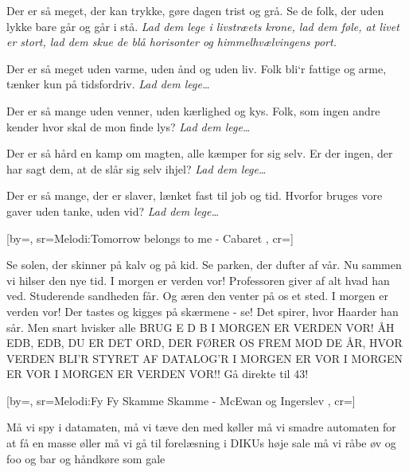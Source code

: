 \documentclass[pdftex,12pt]{article}
\begin{document}
\begin{songs}{}
\beginverse
Der er så meget, der kan trykke,
gøre dagen trist og grå.
Se de folk, der uden lykke
bare går og går i stå.
\emph{Lad dem lege i livstræets krone,
lad dem føle, at livet er stort,
lad dem skue de blå horisonter
og himmelhvælvingens port.}

\endverse
\beginverse
Der er så meget uden varme,
uden ånd og uden liv.
Folk bli`r fattige og arme,
tænker kun på tidsfordriv.
\emph{Lad dem lege\ldots}

\endverse
\beginverse
Der er så mange uden venner,
uden kærlighed og kys.
Folk, som ingen andre kender
hvor skal de mon finde lys?
\emph{Lad dem lege\ldots}

\endverse
\beginverse
Der er så hård en kamp om magten,
alle kæmper for sig selv.
Er der ingen, der har sagt dem,
at de slår sig selv ihjel?
\emph{Lad dem lege\ldots}

\endverse
\beginverse
Der er så mange, der er slaver,
lænket fast til job og tid.
Hvorfor bruges vore gaver
uden tanke, uden vid?
\emph{Lad dem lege\ldots}

\endverse
\endsong



[by={},
sr={Melodi:Tomorrow belongs to me - Cabaret}
,
cr={}]\hypertarget{I Morgen er Verden Vor}{}
\label{song42}

\beginverse
Se solen, der skinner
på kalv og på kid.
Se parken, der dufter af vår.
Nu sammen vi hilser
den nye tid.
I morgen er verden vor!
\endverse
\beginverse
Professoren giver
af alt hvad han ved.
Studerende sandheden får.
Og æren den venter
på os et sted.
I morgen er verden vor!
\endverse
\beginverse
Der tastes og kigges
på skærmene - se!
Det spirer, hvor Haarder han sår.
Men snart hvisker alle
BRUG  E D B
I MORGEN ER VERDEN VOR!
\endverse
\beginverse
ÅH EDB, EDB,
DU ER DET ORD,
DER FØRER OS FREM MOD DE ÅR,
HVOR VERDEN BLI'R STYRET AF DATALOG'R
I MORGEN ER VOR
I MORGEN ER VOR
I MORGEN ER VERDEN VOR!!
\endverse
\beginverse
\tiny{Gå direkte til 43!}
\endverse
\endsong


[by={},
sr={Melodi:Fy Fy Skamme Skamme - McEwan og Ingerslev}
,
cr={}]\hypertarget{DAT62(1/2)80 Slagsang}{}
\label{song43}

\beginverse

\endverse
\beginverse
Må vi spy i datamaten,
må vi tæve den med køller
må vi smadre automaten
for at få en masse øller
må vi gå til forelæsning
i DIKUs høje sale
må vi råbe øv og foo og bar
og håndkøre som gale


\end{songs}
\end{document}
